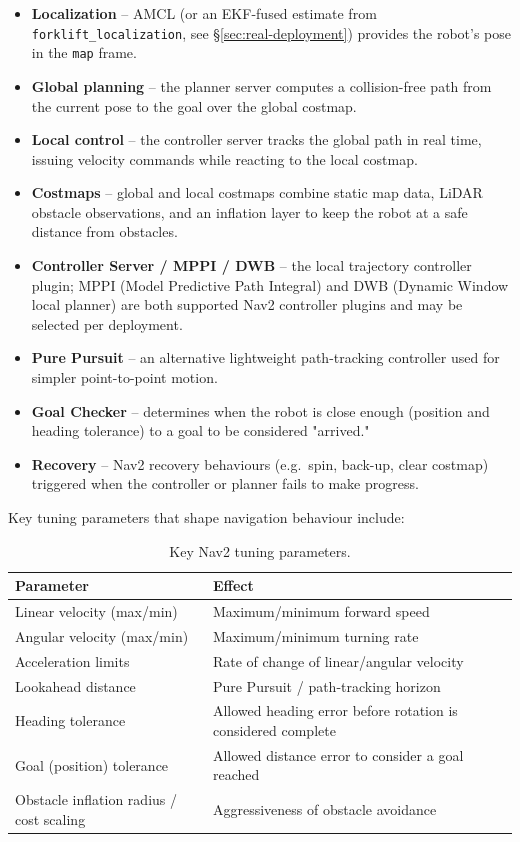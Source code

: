 \documentclass[a4paper, 12pt]{article}
\begin{document}
\begin{itemize}
    \item \textbf{Localization} -- AMCL (or an EKF-fused estimate from
    \texttt{forklift\_localization}, see \S\ref{sec:real-deployment})
    provides the robot's pose in the \texttt{map} frame.
    \item \textbf{Global planning} -- the planner server computes a
    collision-free path from the current pose to the goal over the
    global costmap.
    \item \textbf{Local control} -- the controller server tracks the
    global path in real time, issuing velocity commands while reacting
    to the local costmap.
    \item \textbf{Costmaps} -- global and local costmaps combine static
    map data, LiDAR obstacle observations, and an inflation layer to
    keep the robot at a safe distance from obstacles.
    \item \textbf{Controller Server / MPPI / DWB} -- the local
    trajectory controller plugin; MPPI (Model Predictive Path
    Integral) and DWB (Dynamic Window local planner) are both supported
    Nav2 controller plugins and may be selected per deployment.
    \item \textbf{Pure Pursuit} -- an alternative lightweight
    path-tracking controller used for simpler point-to-point motion.
    \item \textbf{Goal Checker} -- determines when the robot is close
    enough (position and heading tolerance) to a goal to be considered
    "arrived."
    \item \textbf{Recovery} -- Nav2 recovery behaviours (e.g.\ spin,
    back-up, clear costmap) triggered when the controller or planner
    fails to make progress.
\end{itemize}

Key tuning parameters that shape navigation behaviour include:

\begin{table}[H]
\centering
\caption{Key Nav2 tuning parameters.}
\label{tab:nav2-params}
\begin{tabular}{ll}
\toprule
\textbf{Parameter} & \textbf{Effect} \\
\midrule
Linear velocity (max/min) & Maximum/minimum forward speed \\
Angular velocity (max/min) & Maximum/minimum turning rate \\
Acceleration limits & Rate of change of linear/angular velocity \\
Lookahead distance & Pure Pursuit / path-tracking horizon \\
Heading tolerance & Allowed heading error before rotation is considered complete \\
Goal (position) tolerance & Allowed distance error to consider a goal reached \\
Obstacle inflation radius / cost scaling & Aggressiveness of obstacle avoidance \\
\bottomrule
\end{tabular}
\end{table}
\end{document}
